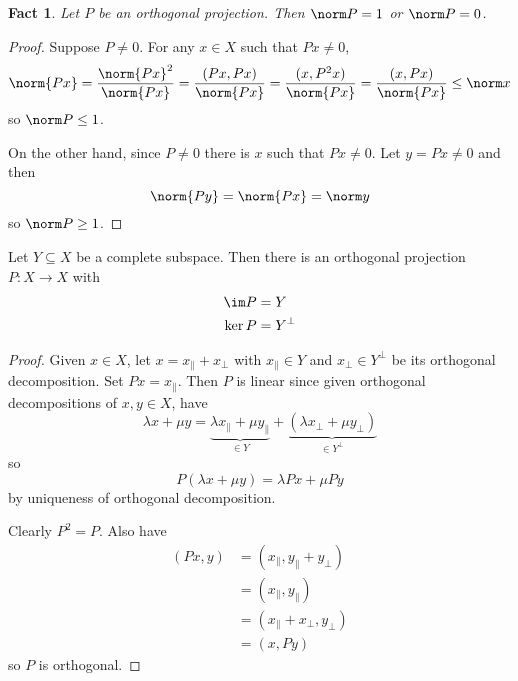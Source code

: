 \documentclass[a4paper]{article}
\newtheorem*{fact}{Fact}
\begin{document}
\begin{fact}
  Let \(P\) be an orthogonal projection. Then \(\norm P = 1\) or \(\norm P = 0\).
\end{fact}

\begin{proof}
  Suppose \(P \neq 0\). For any \(x \in X\) such that \(Px \neq 0\),
  \[
    \norm{Px}
    = \frac{\norm{Px}^2}{\norm{Px}}
    = \frac{(Px, Px)}{\norm{Px}}
    = \frac{(x, P^2x)}{\norm{Px}}
    = \frac{(x, Px)}{\norm{Px}}
    \leq \norm x
  \]
  so \(\norm P \leq 1\).

  On the other hand, since \(P \neq 0\) there is \(x\) such that \(P x \neq 0\). Let \(y = Px \neq 0\) and then
  \[
    \norm{Py} = \norm{Px} = \norm y
  \]
  so \(\norm P \geq 1\).
\end{proof}

\begin{corollary}
  Let \(Y \subseteq X\) be a complete subspace. Then there is an orthogonal projection \(P: X \to X\) with
  \begin{align*}
    \im P &= Y \\
    \ker P &= Y^\perp
  \end{align*}
\end{corollary}

\begin{proof}
  Given \(x \in X\), let \(x = x_\parallel + x_\perp\) with \(x_\parallel \in Y\) and \(x_\perp \in Y^\perp\) be its orthogonal decomposition. Set \(Px = x_\parallel\). Then \(P\) is linear since given orthogonal decompositions of \(x, y \in X\), have
  \[
    \lambda x + \mu y
    = \underbrace{\lambda x_\parallel + \mu y_\parallel}_{\in Y} + \underbrace{(\lambda x_\perp + \mu y_\perp)}_{\in Y^\perp}
  \]
  so
  \[
    P(\lambda x + \mu y) = \lambda Px + \mu Py
  \]
  by uniqueness of orthogonal decomposition.

  Clearly \(P^2 = P\). Also have
  \begin{align*}
    (Px, y)
    &= (x_\parallel, y_\parallel + y_\perp) \\
    &= (x_\parallel, y_\parallel) \\
    &= (x_\parallel + x_\perp, y_\perp) \\
    &= (x, Py)
  \end{align*}
  so \(P\) is orthogonal.
\end{proof}
\end{document}
